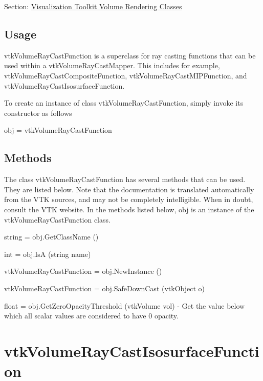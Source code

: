 Section\-: \hyperlink{sec_vtkvolumerendering}{Visualization Toolkit Volume Rendering Classes} \hypertarget{vtkwidgets_vtkxyplotwidget_Usage}{}\subsection{Usage}\label{vtkwidgets_vtkxyplotwidget_Usage}
vtk\-Volume\-Ray\-Cast\-Function is a superclass for ray casting functions that can be used within a vtk\-Volume\-Ray\-Cast\-Mapper. This includes for example, vtk\-Volume\-Ray\-Cast\-Composite\-Function, vtk\-Volume\-Ray\-Cast\-M\-I\-P\-Function, and vtk\-Volume\-Ray\-Cast\-Isosurface\-Function.

To create an instance of class vtk\-Volume\-Ray\-Cast\-Function, simply invoke its constructor as follows \begin{DoxyVerb}  obj = vtkVolumeRayCastFunction
\end{DoxyVerb}
 \hypertarget{vtkwidgets_vtkxyplotwidget_Methods}{}\subsection{Methods}\label{vtkwidgets_vtkxyplotwidget_Methods}
The class vtk\-Volume\-Ray\-Cast\-Function has several methods that can be used. They are listed below. Note that the documentation is translated automatically from the V\-T\-K sources, and may not be completely intelligible. When in doubt, consult the V\-T\-K website. In the methods listed below, {\ttfamily obj} is an instance of the vtk\-Volume\-Ray\-Cast\-Function class. 
\begin{DoxyItemize}
\item {\ttfamily string = obj.\-Get\-Class\-Name ()}  
\item {\ttfamily int = obj.\-Is\-A (string name)}  
\item {\ttfamily vtk\-Volume\-Ray\-Cast\-Function = obj.\-New\-Instance ()}  
\item {\ttfamily vtk\-Volume\-Ray\-Cast\-Function = obj.\-Safe\-Down\-Cast (vtk\-Object o)}  
\item {\ttfamily float = obj.\-Get\-Zero\-Opacity\-Threshold (vtk\-Volume vol)} -\/ Get the value below which all scalar values are considered to have 0 opacity.  
\end{DoxyItemize}\hypertarget{vtkvolumerendering_vtkvolumeraycastisosurfacefunction}{}\section{vtk\-Volume\-Ray\-Cast\-Isosurface\-Function}\label{vtkvolumerendering_vtkvolumeraycastisosurfacefunction}
